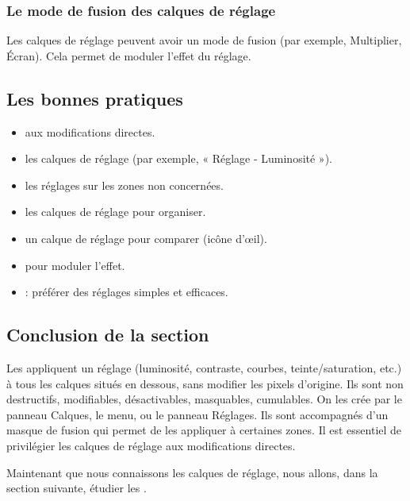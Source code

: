 \subsubsection{Le mode de fusion des calques de réglage}

Les calques de réglage peuvent avoir un mode de fusion (par exemple, Multiplier, Écran). Cela permet de moduler l'effet du réglage.

\subsection{Les bonnes pratiques}

\begin{itemize}
    \item {} aux modifications directes.
    \item {} les calques de réglage (par exemple, « Réglage - Luminosité »).
    \item {} les réglages sur les zones non concernées.
    \item {} les calques de réglage pour organiser.
    \item {} un calque de réglage pour comparer (icône d'œil).
    \item {} pour moduler l'effet.
    \item {} : préférer des réglages simples et efficaces.
\end{itemize}

\subsection*{Conclusion de la section}

Les  appliquent un réglage (luminosité, contraste, courbes, teinte/saturation, etc.) à tous les calques situés en dessous, sans modifier les pixels d'origine. Ils sont non destructifs, modifiables, désactivables, masquables, cumulables. On les crée par le panneau Calques, le menu, ou le panneau Réglages. Ils sont accompagnés d'un masque de fusion qui permet de les appliquer à certaines zones. Il est essentiel de privilégier les calques de réglage aux modifications directes.

Maintenant que nous connaissons les calques de réglage, nous allons, dans la section suivante, étudier les .

